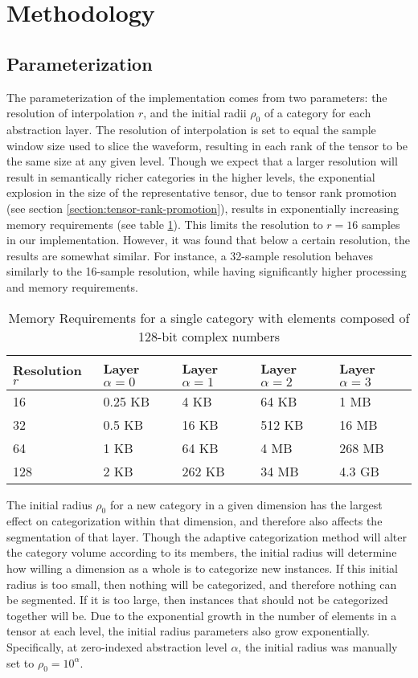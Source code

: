 \section{Methodology}
\label{section:methodology}

\subsection{Parameterization}
\label{section:parameterization}

The parameterization of the implementation comes from two parameters: the resolution of interpolation $r$, and the initial radii $\rho_0$ of a category for each abstraction layer.  The resolution of interpolation is set to equal the sample window size used to slice the waveform, resulting in each rank of the tensor to be the same size at any given level.  Though we expect that a larger resolution will result in semantically richer categories in the higher levels, the exponential explosion in the size of the representative tensor, due to tensor rank promotion (see section \ref{section:tensor-rank-promotion}), results in exponentially increasing memory requirements (see table \ref{table:memory-requirements}). This limits the resolution to $r=16$ samples in our implementation.  However, it was found that below a certain resolution, the results are somewhat similar.  For instance, a 32-sample resolution behaves similarly to the 16-sample resolution, while having significantly higher processing and memory requirements.

\begin{table}
\centering
\begin{tabular}{@{}lllll@{}}
  \toprule
  Resolution $r$ & Layer $\alpha = 0$ & Layer $\alpha = 1$ & Layer $\alpha = 2$ & Layer $\alpha = 3$ \\
  \midrule
  16 & 0.25 KB & 4 KB & 64 KB & 1 MB \\
  32 & 0.5 KB & 16 KB & 512 KB & 16 MB \\
  64 & 1 KB & 64 KB & 4 MB & 268 MB \\
  128 & 2 KB & 262 KB & 34 MB & 4.3 GB \\
  \bottomrule
\end{tabular}
\caption{Memory Requirements for a single category with elements composed of 128-bit complex numbers}
\label{table:memory-requirements}
\end{table}

The initial radius $\rho_0$ for a new category in a given dimension has the largest effect on categorization within that dimension, and therefore also affects the segmentation of that layer.  Though the adaptive categorization method will alter the category volume according to its members, the initial radius will determine how willing a dimension as a whole is to categorize new instances.  If this initial radius is too small, then nothing will be categorized, and therefore nothing can be segmented.  If it is too large, then instances that should not be categorized together will be.  Due to the exponential growth in the number of elements in a tensor at each level, the initial radius parameters also grow exponentially.  Specifically, at zero-indexed abstraction level $\alpha$, the initial radius was manually set to $\rho_0 = 10^{\alpha}$.


